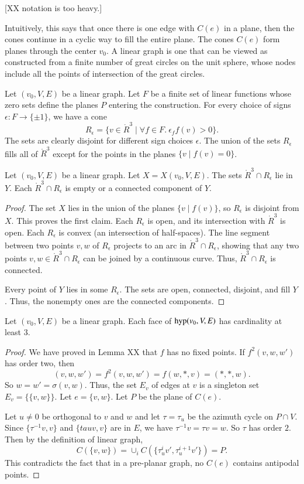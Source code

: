 [XX notation is too heavy.]

Intuitively, this says that once there is one edge with $C(e)$ in a
plane, then the cones continue in a cyclic way to fill the entire
plane. The cones $C(e)$ form planes through the center $v_0$.
A linear graph is one that can be viewed as
constructed from a finite number of great circles on the unit
sphere, whose nodes include all the points of intersection of the
great circles.

Let $(v_0,V,E)$ be a linear graph.   Let $F$ be a finite set of linear
functions whose zero sets define the planes $P$ entering the
construction. For every choice of signs $\epsilon: F\to \{\pm 1\}$,
we have a cone
    $$R_\epsilon = \{v\in\ring{R}^3 \mid \forall f\in F.\ \epsilon_f f(v) > 0\}.$$
The sets are clearly disjoint for different sign choices $\epsilon$.
The union of the sets $R_\epsilon$ fills all of $\ring{R}^3$ except
for the points in the planes $\{v\mid f(v)=0\}$.


\begin{lemma} Let $(v_0,V,E)$ be a linear graph.  Let $X=X(v_0,V,E)$.
The sets $\ring{R}^3\cap
R_\epsilon$ lie in $Y$.  Each $\ring{R}^3\cap R_\epsilon$ is
empty or a connected component of $Y$.
\end{lemma}

\begin{proof}  The set $X$ lies in the union of the planes $\{v\mid
f(v)\}$, so $R_\epsilon$ is disjoint from $X$.  This proves the
first claim.  Each $R_\epsilon$ is open, and its intersection with
$\ring{R}^3$ is open.  Each $R_\epsilon$ is convex (an intersection of
half-spaces).  The line segment between two points $v,w$ of
$R_\epsilon$ projects to an arc in $\ring{R}^3\cap R_\epsilon$, showing
that any two points $v,w\in \ring{R}^3\cap R_\epsilon$ can be joined by a
continuous curve.  Thus, $\ring{R}^3\cap R_\epsilon$ is connected.

Every point of $Y$ lies in some $R_\epsilon$.  The sets
are open, connected, disjoint, and fill $Y$. Thus, the
nonempty ones are the connected components.
\end{proof}

\begin{lemma} Let $(v_0,V,E)$ be a linear graph.  Each face of
${\operatorname{hyp}}(v_0,V,E)$ has cardinality at least $3$.
\end{lemma}

\begin{proof} We have proved in Lemma XX that $f$ has no fixed
points.  If $f^2 (v,w,w')$ has order two, then
    $$(v,w,w') = f^2(v,w,w') = f(w,*,v) = (*,*,w).$$
So $w=w'=\sigma(v,w)$.  Thus, the set $E_v$ of edges at $v$ is a
singleton set $E_v = \{\{v,w\}\}$.  Let $e=\{v,w\}$.  Let $P$ be the
plane of $C(e)$.

Let $u\ne0$ be orthogonal to $v$ and $w$ and let $\tau=\tau_u$ be
the azimuth cycle on $P\cap V$.  Since $\{\tau^{-1}v,v\}$ and $\{tau
v,v\}$ are in $E$, we have $\tau^{-1}v = \tau v = w$.  So $\tau$ has
order $2$.  Then by the definition of linear graph,
  $$C({\{v,w\}}) = \cup_{i} C({\{\tau_u^i v',\tau_u^{i+1} v'\}}) = P.$$
This contradicts the fact that in a pre-planar graph, no $C(e)$
contains antipodal points.
\end{proof}

